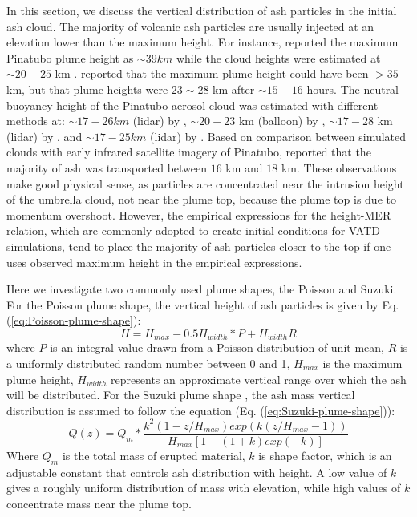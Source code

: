 \documentclass[utf8]{frontiersSCNS} %
\begin{document}
In this section, we discuss the vertical distribution of ash particles in the initial ash cloud.
The majority of volcanic ash particles are usually  injected at an elevation lower than the maximum height. For instance, \citet{holasek1996satellite, holasek1996experiments} reported the maximum Pinatubo plume height as $\sim 39 km$ while the cloud heights were estimated at $\sim 20  - 25$ km . \citet{self1993atmospheric} reported that the maximum plume height could have been $>35$ km, but that plume heights were $23 \sim 28$ km after $\sim 15-16$ hours. The neutral buoyancy height of the Pinatubo aerosol cloud was estimated with different methods at: $\sim 17-26 km$ (lidar) by \citet{defoor1992early}, $\sim 20-23$ km (balloon) by \citet{deshler1992balloonborne}, $\sim 17-28$ km (lidar) by \citet{jager1992pinatubo}, and $\sim 17-25 km$ (lidar) by \citet{avdyushin19931}. Based on comparison between simulated clouds with early infrared satellite imagery of Pinatubo, \citet{fero2008simulation} reported that the majority of ash was transported between $16$ km and $18$ km. These observations make good physical sense, as particles are concentrated near the intrusion height of the umbrella cloud, not near the plume top, because the plume top is due to momentum overshoot. However, the empirical expressions for the height-MER relation, which are commonly adopted to create initial conditions for VATD simulations, tend to place the majority of ash particles closer to the top if one uses observed maximum height in the empirical expressions.

Here we investigate two commonly used plume shapes, the Poisson and Suzuki.
For the Poisson plume shape, the vertical height of ash particles is given by Eq. (\ref{eq:Poisson-plume-shape}):
\begin{equation}
H=H_{max} - 0.5 H_{width}*P+H_{width}R
\label{eq:Poisson-plume-shape}
\end{equation}
where $P$ is an integral value drawn from a Poisson distribution of unit mean, $R$ is a uniformly distributed random number between 0 and 1, $H_{max}$ is the maximum plume height, $H_{width}$ represents an approximate vertical range over which the ash will be distributed.
For the Suzuki plume shape \citep{suzuki1983theoretical}, the ash mass vertical distribution is assumed to follow the equation (Eq. (\ref{eq:Suzuki-plume-shape})):
\begin{equation}
Q(z)=Q_m* \frac{k^2(1-z/H_{max})exp\left(k(z/H_{max} -1 )\right)}{H_{max}\left[1-(1+k)exp(-k)\right]}
\label{eq:Suzuki-plume-shape}
\end{equation}
Where $Q_m$ is the total mass of erupted material, $k$ is shape factor, which is an adjustable constant that controls ash distribution with height. A low value of $k$ gives a roughly uniform distribution of mass with elevation, while high values of $k$ concentrate mass near the plume top.
\end{document}
